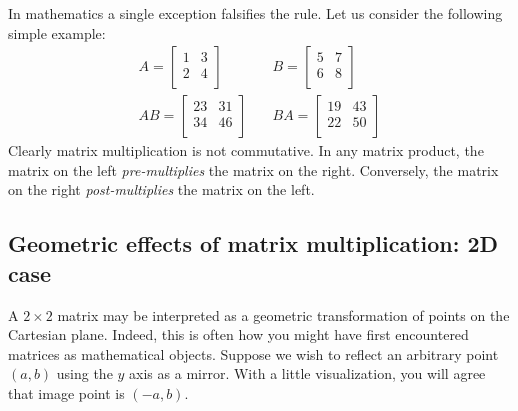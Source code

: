 \documentclass[
  a4paper,
]{article}
\begin{document}
In mathematics a single exception falsifies the rule. Let us consider
the following simple example: \[
\begin{aligned}
A = \left[
\begin{matrix}
1 & 3\\
2 & 4\\
\end{matrix}
\right]
&\quad
B = \left[
\begin{matrix}
5 & 7\\
6 & 8\\
\end{matrix}
\right]
\\
AB = \left[
\begin{matrix}
23 & 31\\
34 & 46\\
\end{matrix}
\right]
&\quad
BA = \left[
\begin{matrix}
19 & 43\\
22 & 50\\
\end{matrix}
\right]
\end{aligned}
\] Clearly matrix multiplication is not commutative. In any matrix
product, the matrix on the left \emph{pre-multiplies} the matrix on the
right. Conversely, the matrix on the right \emph{post-multiplies} the
matrix on the left.

\hypertarget{geometric-effects-of-matrix-multiplication-2d-case}{%
\subsection{Geometric effects of matrix multiplication: 2D
case}\label{geometric-effects-of-matrix-multiplication-2d-case}}

A \(2\times 2\) matrix may be interpreted as a geometric transformation
of points on the Cartesian plane. Indeed, this is often how you might
have first encountered matrices as mathematical objects. Suppose we wish
to reflect an arbitrary point \((a, b)\) using the \(y\) axis as a
mirror. With a little visualization, you will agree that image point is
\((-a, b)\).
\end{document}
